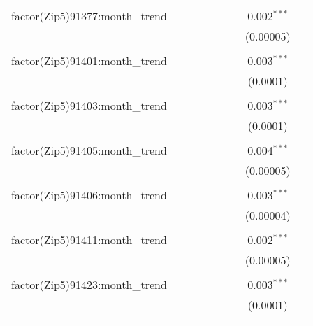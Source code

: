 \begin{table}[H]
{\begin{tabular}{@{\extracolsep{5pt}}lcccccccc}
  factor(Zip5)91377:month\_trend &  &  &  &  &  &  & 0.002$^{***}$ &  \\  

   &  &  &  &  &  &  & (0.00005) &  \\  

   & & & & & & & & \\  

  factor(Zip5)91401:month\_trend &  &  &  &  &  &  & 0.003$^{***}$ &  \\  

   &  &  &  &  &  &  & (0.0001) &  \\  

   & & & & & & & & \\  

  factor(Zip5)91403:month\_trend &  &  &  &  &  &  & 0.003$^{***}$ &  \\  

   &  &  &  &  &  &  & (0.0001) &  \\  

   & & & & & & & & \\  

  factor(Zip5)91405:month\_trend &  &  &  &  &  &  & 0.004$^{***}$ &  \\  

   &  &  &  &  &  &  & (0.00005) &  \\  

   & & & & & & & & \\  

  factor(Zip5)91406:month\_trend &  &  &  &  &  &  & 0.003$^{***}$ &  \\  

   &  &  &  &  &  &  & (0.00004) &  \\  

   & & & & & & & & \\  

  factor(Zip5)91411:month\_trend &  &  &  &  &  &  & 0.002$^{***}$ &  \\  

   &  &  &  &  &  &  & (0.00005) &  \\  

   & & & & & & & & \\  

  factor(Zip5)91423:month\_trend &  &  &  &  &  &  & 0.003$^{***}$ &  \\  

   &  &  &  &  &  &  & (0.0001) &  \\  

   & & & & & & & & \\  


\end{tabular}}
\end{table}
